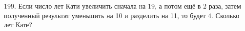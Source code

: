 199.  Если число лет Кати увеличить сначала на 19, а потом ещё в 2 раза, затем полученный результат уменьшить на 10 и разделить на 11, то будет 4. Сколько лет Кате?\\
